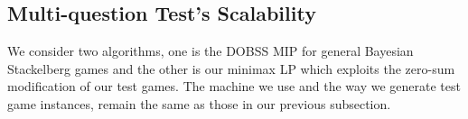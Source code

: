 \documentclass{article}
\begin{document}

\subsection{Multi-question Test's Scalability}

We consider two algorithms, one is the DOBSS MIP for general Bayesian
Stackelberg games and the other is our minimax LP which exploits the zero-sum
modification of our test games. The machine we use and the way we generate test
game instances, remain the same as those in our previous subsection.
\end{document}

